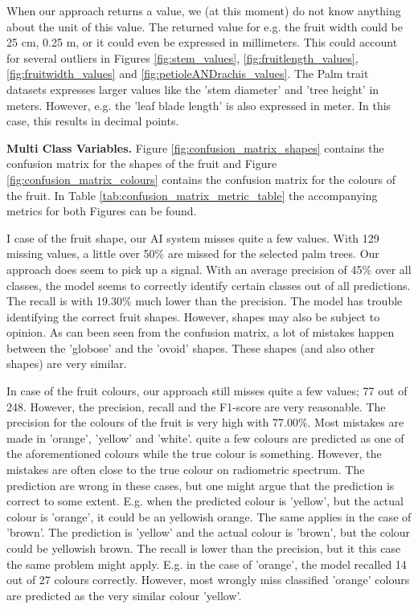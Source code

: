 \documentclass[a4paper, 12pt, oneside]{book} %
\begin{document}
When our approach returns a value, we (at this moment) do not know anything about the unit of this value.
The returned value for e.g. the fruit width could be 25 cm, 0.25 m, or it could even be expressed in millimeters. 
This could account for several outliers in Figures \ref{fig:stem_values}, \ref{fig:fruitlength_values}, \ref{fig:fruitwidth_values} and \ref{fig:petioleANDrachis_values}.
The Palm trait datasets expresses larger values like the 'stem diameter' and 'tree height' in meters.
However, e.g. the 'leaf blade length' is also expressed in meter. 
In this case, this results in decimal points.

\noindent
\newline
\textbf{Multi Class Variables.}
Figure \ref{fig:confusion_matrix_shapes} contains the confusion matrix for the shapes of the fruit and Figure \ref{fig:confusion_matrix_colours} contains the confusion matrix for the colours of the fruit.
In Table \ref{tab:confusion_matrix_metric_table} the accompanying metrics for both Figures can be found. 

I case of the fruit shape, our AI system misses quite a few values. 
With 129 missing values, a little over 50\% are missed for the selected palm trees.
Our approach does seem to pick up a signal.
With an average precision of 45\% over all classes, the model seems to correctly identify certain classes out of all predictions.
The recall is with 19.30\% much lower than the precision.
The model has trouble identifying the correct fruit shapes.
However, shapes may also be subject to opinion.
As can been seen from the confusion matrix, a lot of mistakes happen between the 'globose' and the 'ovoid' shapes.
These shapes (and also other shapes) are very similar.

In case of the fruit colours, our approach still misses quite a few values; 77 out of 248.
However, the precision, recall and the F1-score are very reasonable.
The precision for the colours of the fruit is very high with 77.00\%.
Most mistakes are made in 'orange', 'yellow' and 'white'.
quite a few colours are predicted as one of the aforementioned colours while the true colour is something.
However, the mistakes are often close to the true colour on radiometric spectrum.
The prediction are wrong in these cases, but one might argue that the prediction is correct to some extent.
E.g. when the predicted colour is 'yellow', but the actual colour is 'orange', it could be an yellowish orange.
The same applies in the case of 'brown'.
The prediction is 'yellow' and the actual colour is 'brown', but the colour could be yellowish brown.
The recall is lower than the precision, but it this case the same problem might apply.
E.g. in the case of 'orange', the model recalled 14 out of 27 colours correctly. 
However, most wrongly miss classified 'orange' colours are predicted as the very similar colour 'yellow'.
\end{document}
